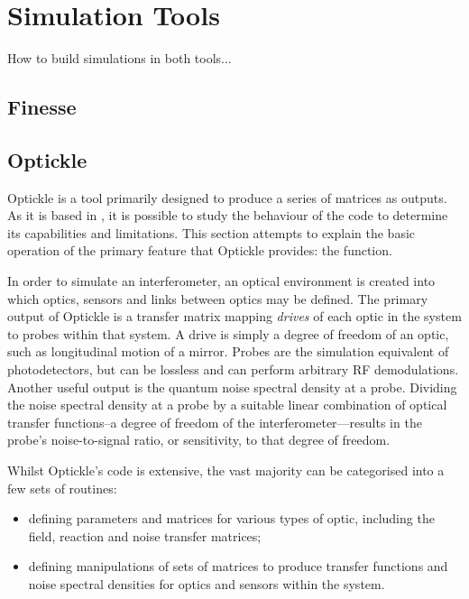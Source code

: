 \chapter{Simulation Tools}
How to build simulations in both tools...


\section{Finesse}

\section{Optickle}
Optickle is a tool primarily designed to produce a series of matrices as outputs. As it is based in \MATLAB, it is possible to study the behaviour of the code to determine its capabilities and limitations. This section attempts to explain the basic operation of the primary feature that Optickle provides: the  function.

In order to simulate an interferometer, an optical environment is created into which optics, sensors and links between optics may be defined. The primary output of Optickle is a transfer matrix mapping \emph{drives} of each optic in the system to probes within that system. A drive is simply a degree of freedom of an optic, such as longitudinal motion of a mirror. Probes are the simulation equivalent of photodetectors, but can be lossless and can perform arbitrary RF demodulations. Another useful output is the quantum noise spectral density at a probe. Dividing the noise spectral density at a probe by a suitable linear combination of optical transfer functions--a degree of freedom of the interferometer---results in the probe's noise-to-signal ratio, or sensitivity, to that degree of freedom.

Whilst Optickle's code is extensive, the vast majority can be categorised into a few sets of routines:

\begin{itemize}
  \item defining parameters and matrices for various types of optic, including the field, reaction and noise transfer matrices;
  \item defining manipulations of sets of matrices to produce transfer functions and noise spectral densities for optics and sensors within the system.
\end{itemize}

